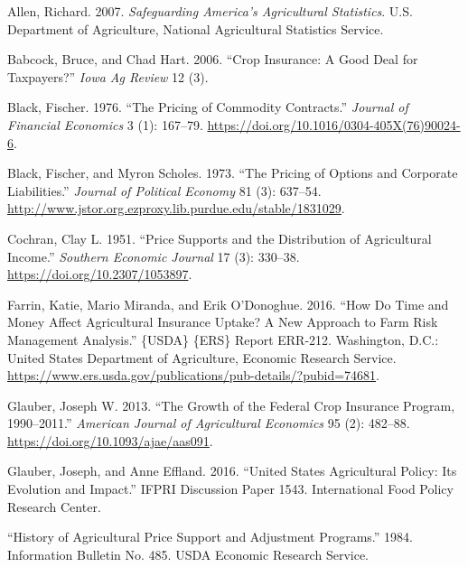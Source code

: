 \documentclass[
  letterpaper,
  DIV=11,
  numbers=noendperiod]{scrreprt}
\newlength{\cslhangindent}
\newenvironment{CSLReferences}[2] %
 {\begin{list}{}{%
  \setlength{\itemindent}{0pt}
  \setlength{\leftmargin}{0pt}
  \setlength{\parsep}{0pt}
  \ifodd #1
   \setlength{\leftmargin}{\cslhangindent}
   \setlength{\itemindent}{-1\cslhangindent}
  \fi
  \setlength{\itemsep}{#2\baselineskip}}}
 {\end{list}}
\begin{document}
\label{refs}
\begin{CSLReferences}{1}{0}
Allen, Richard. 2007. \emph{Safeguarding America's Agricultural
Statistics}. U.S. Department of Agriculture, National Agricultural
Statistics Service.

Babcock, Bruce, and Chad Hart. 2006. {``Crop Insurance: A Good Deal for
Taxpayers?''} \emph{Iowa Ag Review} 12 (3).

Black, Fischer. 1976. {``The Pricing of Commodity Contracts.''}
\emph{Journal of Financial Economics} 3 (1): 167--79.
\url{https://doi.org/10.1016/0304-405X(76)90024-6}.

Black, Fischer, and Myron Scholes. 1973. {``The Pricing of Options and
Corporate Liabilities.''} \emph{Journal of Political Economy} 81 (3):
637--54.
\url{http://www.jstor.org.ezproxy.lib.purdue.edu/stable/1831029}.

Cochran, Clay L. 1951. {``Price Supports and the Distribution of
Agricultural Income.''} \emph{Southern Economic Journal} 17 (3):
330--38. \url{https://doi.org/10.2307/1053897}.

Farrin, Katie, Mario Miranda, and Erik O'Donoghue. 2016. {``How Do Time
and Money Affect Agricultural Insurance Uptake? A New Approach to Farm
Risk Management Analysis.''} \{USDA\} \{ERS\} Report {ERR}-212.
Washington, D.C.: United States Department of Agriculture, Economic
Research Service.
\url{https://www.ers.usda.gov/publications/pub-details/?pubid=74681}.

Glauber, Joseph W. 2013. {``The Growth of the Federal Crop Insurance
Program, 1990--2011.''} \emph{American Journal of Agricultural
Economics} 95 (2): 482--88. \url{https://doi.org/10.1093/ajae/aas091}.

Glauber, Joseph, and Anne Effland. 2016. {``United States Agricultural
Policy: Its Evolution and Impact.''} {IFPRI} Discussion Paper 1543.
International Food Policy Research Center.

{``History of Agricultural Price Support and Adjustment Programs.''}
1984. Information Bulletin No. 485. {USDA} Economic Research Service.


\end{CSLReferences}
\end{document}
